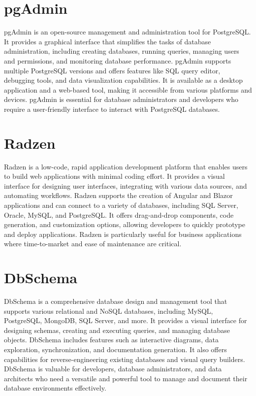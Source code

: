 \documentclass[12pt]{report}
\begin{document}
\section{pgAdmin}

pgAdmin is an open-source management and administration tool for PostgreSQL. It provides a graphical interface that simplifies the tasks of database administration, including creating databases, running queries, managing users and permissions, and monitoring database performance. pgAdmin supports multiple PostgreSQL versions and offers features like SQL query editor, debugging tools, and data visualization capabilities. It is available as a desktop application and a web-based tool, making it accessible from various platforms and devices. pgAdmin is essential for database administrators and developers who require a user-friendly interface to interact with PostgreSQL databases.

\section{Radzen}

Radzen is a low-code, rapid application development platform that enables users to build web applications with minimal coding effort. It provides a visual interface for designing user interfaces, integrating with various data sources, and automating workflows. Radzen supports the creation of Angular and Blazor applications and can connect to a variety of databases, including SQL Server, Oracle, MySQL, and PostgreSQL. It offers drag-and-drop components, code generation, and customization options, allowing developers to quickly prototype and deploy applications. Radzen is particularly useful for business applications where time-to-market and ease of maintenance are critical.

\section{DbSchema}

DbSchema is a comprehensive database design and management tool that supports various relational and NoSQL databases, including MySQL, PostgreSQL, MongoDB, SQL Server, and more. It provides a visual interface for designing schemas, creating and executing queries, and managing database objects. DbSchema includes features such as interactive diagrams, data exploration, synchronization, and documentation generation. It also offers capabilities for reverse-engineering existing databases and visual query builders. DbSchema is valuable for developers, database administrators, and data architects who need a versatile and powerful tool to manage and document their database environments effectively.


\end{document}
